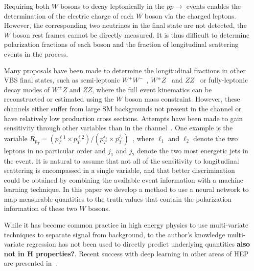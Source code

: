 Requiring both $W$ bosons to decay leptonically in the $pp
\to$ \ssWW events enables the determination of the electric charge of
each $W$ boson via the charged leptons. However, the
corresponding two neutrinos in the final state are not detected, the
$W$ boson rest frames cannot be directly measured.  It is thus
difficult to determine polarization fractions of each boson and
the fraction of longitudinal scattering events in the \ssWW process.

Many proposals have been made to determine the longitudinal fractions in other VBS final states, such as semi-leptonic
$W^+W^-$~\cite{Han:2009em}, $W^\pm Z$~\cite{aa} and $ZZ$~\cite{le houche report} or
fully-leptonic decay modes of $W^\pm Z$ and $ZZ$, where the full
event kinematics can be reconstructed or estimated using the $W$ boson mass constraint. 
However, these channels either suffer from large SM backgrounds not present in the \ssWW channel or
have relatively low production cross sections. Attempts have been made
to gain sensitivity through other variables than \ts in the \ssWW
channel~\cite{aaa}. One example is the variable $R_{p_T}=(p_{T}^{\ell 1} \times
p_{T}^{\ell 2}) / (p_T^{j_1} \times p_T^{j_2})$~\cite{Doroba:2012pd},
where $\ell_1$ and $\ell_2$ denote the two leptons in no particular
order and $j_1$ and $j_2$ denote the two most energetic jets in the
event.  It is natural to assume that not all of the sensitivity to
longitudinal scattering is encompassed in a single variable, and that
better discrimination could be obtained by combining the available
event information with a machine learning technique. In this paper we
develop a method to use a neural network to map measurable quantities
to the truth \cts values that contain the polarization information of
these two $W$ bosons.

While it has become common practice in high energy physics to use
multi-variate techniques to separate signal from background, to the
author's knowledge multi-variate regression has not been used to
directly predict underlying quantities {\bf also not in H
  properties?}.  Recent success with deep learning in other areas of
HEP are presented in~\cite{Baldi:2014kfa,Baldi:2014pta}.

